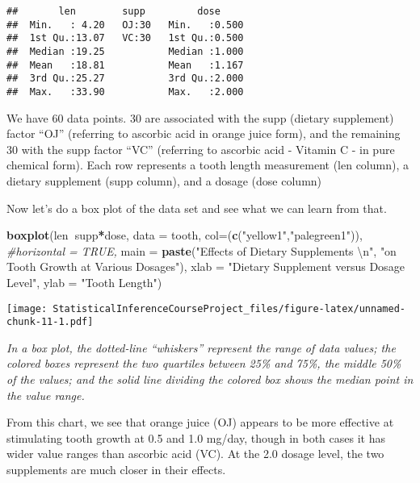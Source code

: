 \documentclass[]{article}
\newenvironment{Shaded}{\begin{snugshade}}{\end{snugshade}}
\newcommand{\KeywordTok}[1]{\textcolor[rgb]{0.13,0.29,0.53}{\textbf{#1}}}
\newcommand{\DataTypeTok}[1]{\textcolor[rgb]{0.13,0.29,0.53}{#1}}
\newcommand{\CharTok}[1]{\textcolor[rgb]{0.31,0.60,0.02}{#1}}
\newcommand{\StringTok}[1]{\textcolor[rgb]{0.31,0.60,0.02}{#1}}
\newcommand{\CommentTok}[1]{\textcolor[rgb]{0.56,0.35,0.01}{\textit{#1}}}
\newcommand{\OperatorTok}[1]{\textcolor[rgb]{0.81,0.36,0.00}{\textbf{#1}}}
\newcommand{\NormalTok}[1]{#1}
\begin{document}
\begin{verbatim}
##       len        supp         dose      
##  Min.   : 4.20   OJ:30   Min.   :0.500  
##  1st Qu.:13.07   VC:30   1st Qu.:0.500  
##  Median :19.25           Median :1.000  
##  Mean   :18.81           Mean   :1.167  
##  3rd Qu.:25.27           3rd Qu.:2.000  
##  Max.   :33.90           Max.   :2.000
\end{verbatim}

We have 60 data points. 30 are associated with the supp (dietary
supplement) factor ``OJ'' (referring to ascorbic acid in orange juice
form), and the remaining 30 with the supp factor ``VC'' (referring to
ascorbic acid - Vitamin C - in pure chemical form). Each row represents
a tooth length measurement (len column), a dietary supplement (supp
column), and a dosage (dose column)

Now let's do a box plot of the data set and see what we can learn from
that.

\begin{Shaded}
\begin{Highlighting}[]
\KeywordTok{boxplot}\NormalTok{(len}\OperatorTok{~}\NormalTok{supp}\OperatorTok{*}\NormalTok{dose, }
        \DataTypeTok{data =}\NormalTok{ tooth, }
        \DataTypeTok{col=}\NormalTok{(}\KeywordTok{c}\NormalTok{(}\StringTok{"yellow1"}\NormalTok{,}\StringTok{"palegreen1"}\NormalTok{)),}
        \CommentTok{#horizontal = TRUE,}
        \DataTypeTok{main =} \KeywordTok{paste}\NormalTok{(}\StringTok{"Effects of Dietary Supplements }\CharTok{\textbackslash{}n}\StringTok{"}\NormalTok{,}
                     \StringTok{"on Tooth Growth at Various Dosages"}\NormalTok{), }
        \DataTypeTok{xlab =} \StringTok{"Dietary Supplement versus Dosage Level"}\NormalTok{,}
        \DataTypeTok{ylab =} \StringTok{"Tooth Length"}\NormalTok{)}
\end{Highlighting}
\end{Shaded}

\texttt{[image: StatisticalInferenceCourseProject\_files/figure-latex/unnamed-chunk-11-1.pdf]}

\emph{In a box plot, the dotted-line ``whiskers'' represent the range of
data values; the colored boxes represent the two quartiles between 25\%
and 75\%, the middle 50\% of the values; and the solid line dividing the
colored box shows the median point in the value range.}

From this chart, we see that orange juice (OJ) appears to be more
effective at stimulating tooth growth at 0.5 and 1.0 mg/day, though in
both cases it has wider value ranges than ascorbic acid (VC). At the 2.0
dosage level, the two supplements are much closer in their effects.
\end{document}
